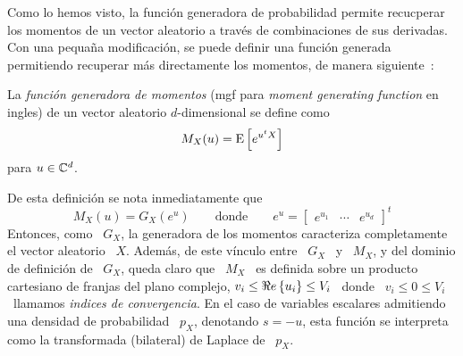 
\label{Ssec:MP:GeneradoraMomentos}


Como lo hemos visto, la  funci\'on generadora de probabilidad permite recucperar
los  momentos  de  un  vector  aleatorio  a trav\'es  de  combinaciones  de  sus
derivadas.   Con una pequa\~na  modificaci\'on, se  puede definir  una funci\'on
generada  permitiendo  recuperar  m\'as  directamente los  momentos,  de  manera
siguiente~\cite{Fel68, JohKot97, Muk00, AthLah06}:
%
\begin{definicion}
\label{Def:MP:GeneradoraMomentos}
%
  La {\em  funci\'on generadora  de momentos} (mgf  para {\em  moment generating
    function} en ingles) de un vector aleatorio $d$-dimensional se define como
  \[
  M_X(u) = \operatorname{E}\left[ e^{u^t X} \right]
  \]
  para $u \in \mathbb{C}^d$.
\end{definicion}
%
De esta definici\'on se nota inmediatamente que
%
\[
M_X(u) = G_X\left( e^u \right)  \qquad \mbox{donde} \qquad e^u = \begin{bmatrix}
  e^{u_1} & \cdots & e^{u_d} \end{bmatrix}^t
\]
%
Entonces, como \ $G_X$, la  generadora de los momentos caracteriza completamente
el vector  aleatorio \ $X$.   Adem\'as, de  este v\'inculo entre  \ $G_X$ \  y \
$M_X$, y del  dominio de definici\'on de \  $G_X$, queda claro que \  $M_X$ \ es
definida sobre un  producto cartesiano de franjas del plano  complejo, $ v_i \le
\Re e \left\{ u_i \right\} \le  V_i$ \ donde \  $v_i \le 0 \le  V_i$ \ llamamos  {\em indices de
  convergencia}.  En el  caso de variables escalares admitiendo  una densidad de
probabilidad \ $p_X$,  denotando $s = -u$, esta funci\'on  se interpreta como la
transformada (bilateral) de Laplace de \ $p_X$.


